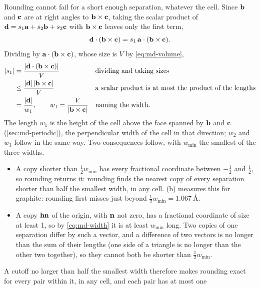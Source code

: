Rounding cannot fail for a short enough separation, whatever the cell.
Since $\bm{\mathrm{b}}$ and $\bm{\mathrm{c}}$ are at right angles to $\bm{\mathrm{b}}\times\bm{\mathrm{c}}$,
taking the scalar product of $\bm{\mathrm{d}} = s_1\bm{\mathrm{a}} + s_2\bm{\mathrm{b}} + s_3\bm{\mathrm{c}}$
with $\bm{\mathrm{b}}\times\bm{\mathrm{c}}$ leaves only the first term,
\begin{equation*}
   \bm{\mathrm{d}}\cdot(\bm{\mathrm{b}}\times\bm{\mathrm{c}}) = s_1\,\bm{\mathrm{a}}\cdot(\bm{\mathrm{b}}\times\bm{\mathrm{c}}) .
\end{equation*}
Dividing by $\bm{\mathrm{a}}\cdot(\bm{\mathrm{b}}\times\bm{\mathrm{c}})$, whose size is $V$ by
\cref{eq:md-volume},
\begin{align}
   \lvert s_1\rvert
   &= \frac{\lvert\bm{\mathrm{d}}\cdot(\bm{\mathrm{b}}\times\bm{\mathrm{c}})\rvert}{V}
   && \text{dividing and taking sizes}\notag\\
   &\le \frac{\lvert\bm{\mathrm{d}}\rvert\,\lvert\bm{\mathrm{b}}\times\bm{\mathrm{c}}\rvert}{V}
   && \text{a scalar product is at most the product of the lengths}
   \notag\\
   &= \frac{\lvert\bm{\mathrm{d}}\rvert}{w_1} ,
   \qquad w_1 = \frac{V}{\lvert\bm{\mathrm{b}}\times\bm{\mathrm{c}}\rvert}
   && \text{naming the width.}
   \label{eq:md-width}
\end{align}
The length $w_1$ is the height of the cell above the face spanned by
$\bm{\mathrm{b}}$ and $\bm{\mathrm{c}}$ (\cref{sec:md-periodic}), the perpendicular width
of the cell in that direction; $w_2$ and $w_3$ follow in the same way.
Two consequences follow, with $w_{\min}$ the smallest of the three widths.
\begin{itemize}
\item A copy shorter than $\frac12w_{\min}$ has every fractional
   coordinate between $-\frac12$ and $\frac12$, so rounding returns it:
   rounding finds the nearest copy of every separation shorter than half
   the smallest width, in any cell. (b) measures this
   for graphite: rounding first misses just beyond $\frac12w_{\min} =
   \SI{1.067}{\angstrom}$.
\item A copy $\bm{\mathrm{h}}\bm{\mathrm{n}}$ of the origin, with $\bm{\mathrm{n}}$ not zero, has a
   fractional coordinate of size at least 1, so by \cref{eq:md-width} it is
   at least $w_{\min}$ long. Two copies of one separation differ by such
   a vector, and a difference of two vectors is no longer than the sum of
   their lengths (one side of a triangle is no longer than the other two
   together), so they cannot both be shorter than $\frac12w_{\min}$.
\end{itemize}
A cutoff no larger than half the smallest width therefore makes rounding
exact for every pair within it, in any cell, and each pair has at most one
